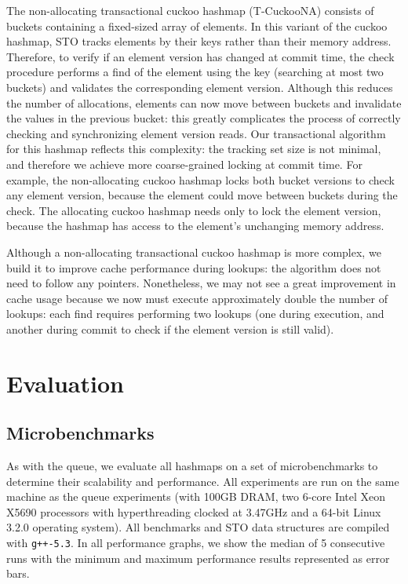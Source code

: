 The non-allocating transactional cuckoo hashmap (T-CuckooNA) consists of buckets containing a fixed-sized array of elements. In this variant of the cuckoo hashmap, STO tracks elements by their keys rather than their memory address. Therefore, to verify if an element version has changed at commit time, the check procedure performs a find of the element using the key (searching at most two buckets) and validates the corresponding element version. Although this reduces the number of allocations, elements can now move between buckets and invalidate the values in the previous bucket: this greatly complicates the process of correctly checking and synchronizing element version reads. Our transactional algorithm for this hashmap reflects this complexity: the tracking set size is not minimal, and therefore we achieve more coarse-grained locking at commit time. For example, the non-allocating cuckoo hashmap locks both bucket versions to check any element version, because the element could move between buckets during the check. The allocating cuckoo hashmap needs only to lock the element version, because the hashmap has access to the element's unchanging memory address. 

Although a non-allocating transactional cuckoo hashmap is more complex, we build it to improve cache performance during lookups: the algorithm does not need to follow any pointers. Nonetheless, we may not see a great improvement in cache usage because we now must execute approximately double the number of lookups: each find requires performing two lookups (one during execution, and another during commit to check if the element version is still valid).


\section{Evaluation}

\subsection{Microbenchmarks}
As with the queue, we evaluate all hashmaps on a set of microbenchmarks to determine their scalability and performance. All experiments are run on the same machine as the queue experiments (with 100GB DRAM, two 6-core Intel Xeon X5690 processors with hyperthreading clocked at 3.47GHz and a 64-bit Linux 3.2.0 operating system). All benchmarks and STO data structures are compiled with \texttt{g++-5.3}. In all performance graphs, we show the median of 5 consecutive runs with the minimum and maximum performance results represented as error bars.

